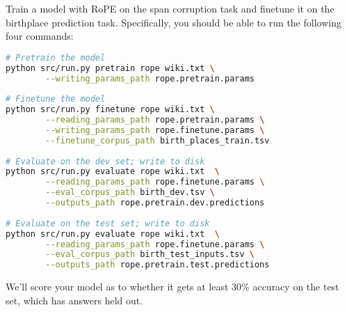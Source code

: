 \begin{parts}
\begin{subparts}
Train a model with RoPE on the span corruption task and finetune it on the birthplace prediction task. Specifically, you should be able to run the following four commands:

\begin{lstlisting}[language=bash]
# Pretrain the model
python src/run.py pretrain rope wiki.txt \
        --writing_params_path rope.pretrain.params
        
# Finetune the model
python src/run.py finetune rope wiki.txt \
        --reading_params_path rope.pretrain.params \
        --writing_params_path rope.finetune.params \
        --finetune_corpus_path birth_places_train.tsv
        
# Evaluate on the dev set; write to disk
python src/run.py evaluate rope wiki.txt  \
        --reading_params_path rope.finetune.params \
        --eval_corpus_path birth_dev.tsv \
        --outputs_path rope.pretrain.dev.predictions
        
# Evaluate on the test set; write to disk
python src/run.py evaluate rope wiki.txt  \
        --reading_params_path rope.finetune.params \
        --eval_corpus_path birth_test_inputs.tsv \
        --outputs_path rope.pretrain.test.predictions

\end{lstlisting}


We'll score your model as to whether it gets at least 30\% accuracy on the test set, which has answers held out.

\end{subparts}

\end{parts}

